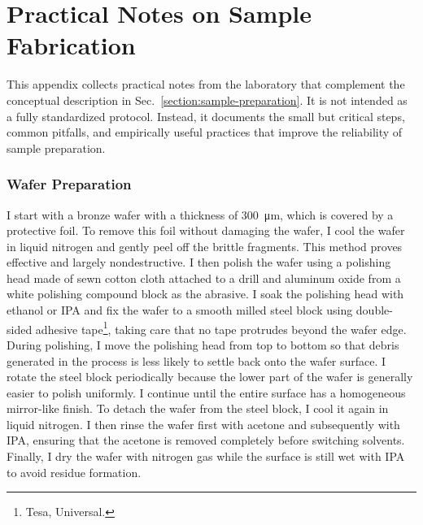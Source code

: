 \chapter{Practical Notes on Sample Fabrication}
\label{appendix:sample-fabrication}

    This appendix collects practical notes from the laboratory that complement the conceptual description in Sec.~\ref{section:sample-preparation}. It is not intended as a fully standardized protocol. Instead, it documents the small but critical steps, common pitfalls, and empirically useful practices that improve the reliability of sample preparation.


    \subsection*{Wafer Preparation}

        I start with a bronze wafer with a thickness of \qty{300}{\micro\meter}, which is covered by a protective foil. To remove this foil without damaging the wafer, I cool the wafer in liquid nitrogen and gently peel off the brittle fragments. This method proves effective and largely nondestructive. I then polish the wafer using a polishing head made of sewn cotton cloth attached to a drill and aluminum oxide from a white polishing compound block as the abrasive. I soak the polishing head with ethanol or IPA and fix the wafer to a smooth milled steel block using double-sided adhesive tape\footnote{Tesa, Universal.}, taking care that no tape protrudes beyond the wafer edge. During polishing, I move the polishing head from top to bottom so that debris generated in the process is less likely to settle back onto the wafer surface. I rotate the steel block periodically because the lower part of the wafer is generally easier to polish uniformly. I continue until the entire surface has a homogeneous mirror-like finish. To detach the wafer from the steel block, I cool it again in liquid nitrogen. I then rinse the wafer first with acetone and subsequently with IPA, ensuring that the acetone is removed completely before switching solvents. Finally, I dry the wafer with nitrogen gas while the surface is still wet with IPA to avoid residue formation. \cite{oberg_machinerys_2000}
        
